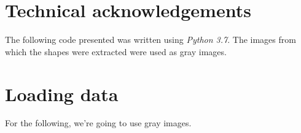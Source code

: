 \section{Technical acknowledgements}
The following code presented was written using \emph{Python 3.7}. The images from which the shapes were extracted were used as gray images.

\section{Loading data}
For the following, we're going to use gray images.